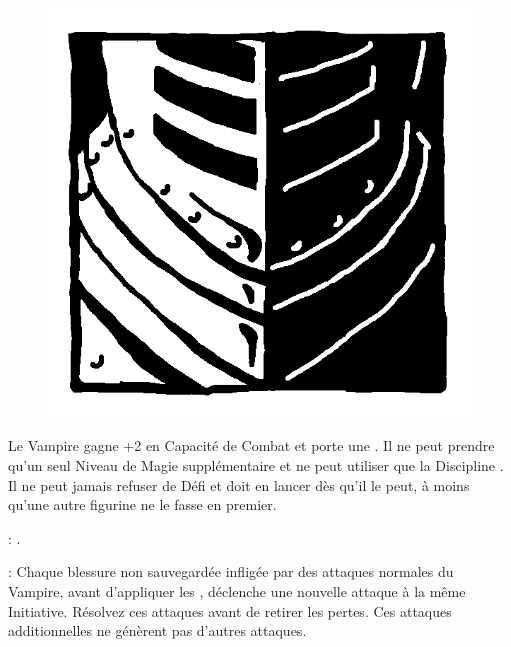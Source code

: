 
\begin{figure}
\centering
\includegraphics[width=\logosize]{pics/logo_brotherhood.png}
\end{figure}
Le Vampire gagne +2 en Capacité de Combat et porte une \platearmour{}. Il ne peut prendre qu'un seul Niveau de Magie supplémentaire et ne peut utiliser que la Discipline \necromancy{}. Il ne peut jamais refuser de Défi et doit en lancer dès qu'il le peut, à moins qu'une autre figurine ne le fasse en premier.

\vspace{0.5cm}
\bloodtie{} : \textbf{\vampireknights}.

\vspace{0.5cm}
\ancientbloodpower{} : \textbf{\crimsonrage}\dotfill{}\newline%
Chaque blessure non sauvegardée infligée par des attaques normales du Vampire, avant d'appliquer les \multiplewounds{}{}, déclenche une nouvelle attaque à la même Initiative. Résolvez ces attaques avant de retirer les pertes. Ces attaques additionnelles ne génèrent pas d'autres attaques.


